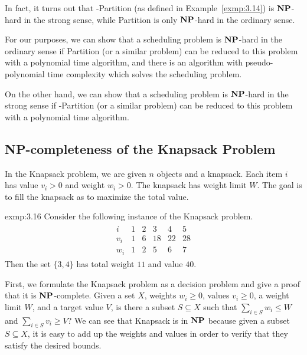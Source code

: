 In fact, it turns out that {-Partition} (as defined in Example~\ref{exmp:3.14})
is $\operatorname{\textbf{NP}}$-hard in the strong sense, while {\sc Partition} is only $\operatorname{\textbf{NP}}$-hard 
in the ordinary sense. 

For our purposes, we can show that a scheduling problem is $\operatorname{\textbf{NP}}$-hard 
in the ordinary sense if {\sc Partition} (or a similar problem) can be 
reduced to this problem with a polynomial time algorithm, and there 
is an algorithm with pseudo-polynomial time complexity which solves the 
scheduling problem. 

On the other hand, we can show that a scheduling problem is $\operatorname{\textbf{NP}}$-hard 
in the strong sense if {-Partition} (or a similar problem) can be 
reduced to this problem with a polynomial time algorithm. 

\subsection{{\bf NP}-completeness of the Knapsack Problem}\label{subsec:3.3}
In the {\sc Knapsack} problem, we are given $n$ objects and a knapsack. 
Each item $i$ has value $v_i > 0$ and weight $w_i > 0$. The knapsack 
has weight limit $W$. The goal is to fill the knapsack as to maximize 
the total value. 

\begin{exmp}{exmp:3.16}
    Consider the following instance of the {\sc Knapsack} problem.
    \begin{align*}
        \begin{array}{c|ccccc}
            i & 1 & 2 & 3 & 4 & 5 \\ \hline 
            v_i & 1 & 6 & 18 & 22 & 28 \\ 
            w_i & 1 & 2 & 5 & 6 & 7
        \end{array}
    \end{align*}
    Then the set $\{3, 4\}$ has total weight $11$ and value $40$. 
\end{exmp}

First, we formulate the {\sc Knapsack} problem as a decision problem
and give a proof that it is $\operatorname{\textbf{NP}}$-complete. 
Given a set $X$, weights $w_i \geq 0$, values $v_i \geq 0$, a weight 
limit $W$, and a target value $V$, is there a subset $S \subseteq X$ 
such that $\sum_{i\in S} w_i \leq W$ and $\sum_{i\in S} v_i \geq V$? 
We can see that {\sc Knapsack} is in $\operatorname{\textbf{NP}}$ because given a subset $S \subseteq X$, 
it is easy to add up the weights and values in order to verify that they 
satisfy the desired bounds. 

